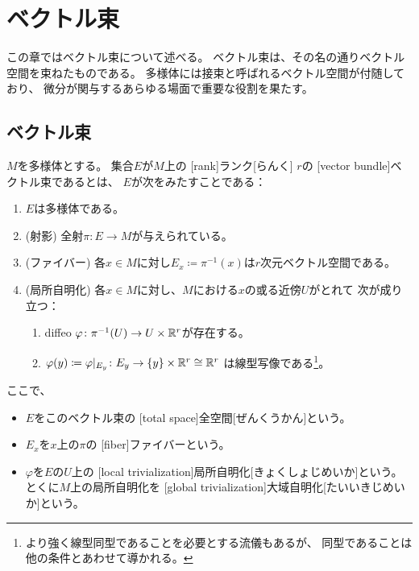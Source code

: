 \documentclass[report]{jlreq}
\begin{document}
%
\chapter{ベクトル束}

この章ではベクトル束について述べる。
ベクトル束は、その名の通りベクトル空間を束ねたものである。
多様体には接束と呼ばれるベクトル空間が付随しており、
微分が関与するあらゆる場面で重要な役割を果たす。

%
\section{ベクトル束}

\begin{definition}[ベクトル束]
    $M$を多様体とする。
    集合$E$が$M$上の
    [rank]{ランク}[らんく] $r$の
    [vector bundle]{ベクトル束}であるとは、
    $E$が次をみたすことである：
    \begin{enumerate}
        \item $E$は多様体である。
        \item (射影) {\smooth}全射$\pi \colon E \to M$が与えられている。
        \item (ファイバー) 各$x \in M$に対し$E_x \coloneqq \pi^{-1}(x)$は$r$次元ベクトル空間である。
        \item (局所自明化) 各$x \in M$に対し、$M$における$x$の或る近傍$U$がとれて
            次が成り立つ：
            \begin{enumerate}
                \item diffeo $\varphi \colon \pi^{-1}(U) \to U \times \mathbb{R}^r$が存在する。
                \item $\varphi(y) \coloneqq \varphi|_{E_y}
                    \colon E_y \to \{y\} \times \mathbb{R}^r \cong \mathbb{R}^r$
                    は線型写像である\footnote{
                        より強く線型同型であることを必要とする流儀もあるが、
                        同型であることは他の条件とあわせて導かれる。
                    }。
            \end{enumerate}
    \end{enumerate}
    ここで、
    \begin{itemize}
        \item $E$をこのベクトル束の
            [total space]{全空間}[ぜんくうかん]という。
        \item $E_x$を$x$上の$\pi$の
            [fiber]{ファイバー}という。
        \item $\varphi$を$E$の$U$上の
            [local trivialization]{局所自明化}[きょくしょじめいか]という。
            とくに$M$上の局所自明化を
            [global trivialization]{大域自明化}[たいいきじめいか]という。
    \end{itemize}
\end{definition}
\end{document}
